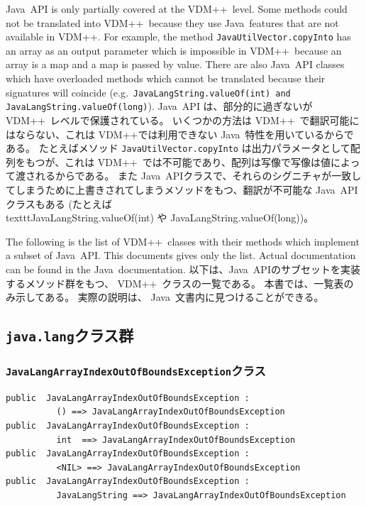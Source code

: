 \documentclass[\pformat,12pt]{jarticle}
\newcommand{\JAVA}{Java}
\newcommand{\VDM}{VDM++}
\begin{document}
\JAVA\ API is only partially covered at the \VDM\ level. 
Some methods could not be translated into \VDM\
because they use \JAVA\ features that are not available in \VDM{}.
For example, the method \texttt{JavaUtilVector.copyInto} has an array
as an output parameter which is impossible in \VDM\ because an array
is a map and a map is passed by value. There are also \JAVA\ API
classes which have overloaded methods which cannot be translated
because their signatures will coincide (e.g.\
\texttt{JavaLangString.valueOf(int) and
  JavaLangString.valueOf(long)}). 
\JAVA\ API は、部分的に過ぎないが \VDM\ レベルで保護されている。
いくつかの方法は \VDM\ で翻訳可能にはならない、これは \VDM{}では利用できない \JAVA\ 特性を用いているからである。
たとえばメソッド \texttt{JavaUtilVector.copyInto} は出力パラメータとして配列をもつが、これは \VDM\ では不可能であり、配列は写像で写像は値によって渡されるからである。
また \JAVA\ APIクラスで、それらのシグニチャが一致してしまうために上書きされてしまうメソッドをもつ、翻訳が不可能な \JAVA\ APIクラスもある (たとえば\\texttt{JavaLangString.valueOf(int) や  JavaLangString.valueOf(long)})。 

The following is the list of \VDM\ classes with their methods
which implement a subset of \JAVA\ API.
This documents gives only the list.
Actual documentation can be found in the \JAVA\ documentation.
以下は、\JAVA\ APIのサブセットを実装するメソッド群をもつ、 \VDM\ クラスの一覧である。
本書では、一覧表のみ示してある。
実際の説明は、 \JAVA\ 文書内に見つけることができる。

\subsection{\texttt{java.lang}クラス群}

\subsubsection{\texttt{JavaLangArrayIndexOutOfBoundsException}クラス}
\begin{small}
\begin{verbatim}
public  JavaLangArrayIndexOutOfBoundsException : 
          () ==> JavaLangArrayIndexOutOfBoundsException
public  JavaLangArrayIndexOutOfBoundsException : 
          int  ==> JavaLangArrayIndexOutOfBoundsException
public  JavaLangArrayIndexOutOfBoundsException : 
          <NIL> ==> JavaLangArrayIndexOutOfBoundsException
public  JavaLangArrayIndexOutOfBoundsException : 
          JavaLangString ==> JavaLangArrayIndexOutOfBoundsException
\end{verbatim}
\end{small}
\end{document}
